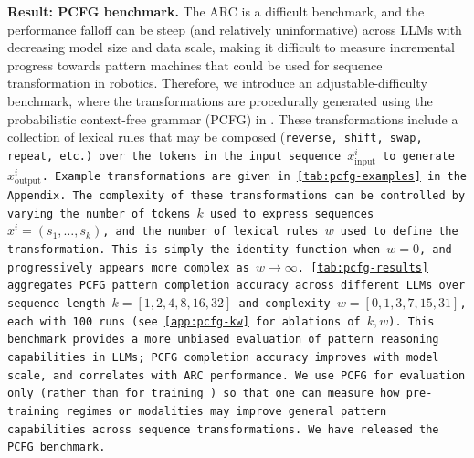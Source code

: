 \textbf{Result: PCFG benchmark.} The ARC is a difficult benchmark, and the performance falloff can be steep (and relatively uninformative) across LLMs with decreasing model size and data scale, making it difficult to measure incremental progress towards pattern machines that could be used for sequence transformation in robotics. Therefore, we introduce an adjustable-difficulty benchmark, where the transformations are procedurally generated using the probabilistic context-free grammar (PCFG) in \citet{hupkes2020compositionality}. 
These transformations include a collection of lexical rules that may be composed (\eg \tt{reverse}, \tt{shift}, \tt{swap}, \tt{repeat}, etc.) over the tokens in the input sequence $x^{i}_{\text{input}}$ to generate $x^{i}_{\text{output}}$.
Example transformations are given in \cref{tab:pcfg-examples} in the Appendix.
The complexity of these transformations can be controlled by varying the number of tokens $k$ used to express sequences $x^i=(s_1,\dots,s_k)$, and the number of lexical rules $w$ used to define the transformation. This is simply the identity function when $w=0$, and progressively appears more complex as $w\rightarrow\infty$. \cref{tab:pcfg-results} aggregates PCFG pattern completion accuracy across different LLMs over sequence length $k = [1, 2, 4, 8, 16, 32]$ and complexity $w = [0, 1, 3, 7, 15, 31]$, each with 100 runs (see \cref{app:pcfg-kw} for ablations of $k, w$).
This benchmark provides a more unbiased evaluation of pattern reasoning capabilities in LLMs; PCFG completion accuracy improves with model scale, and correlates with ARC performance. We use PCFG for evaluation only (rather than for training \cite{hupkes2020compositionality,allen2023physics}) so that one can measure how pre-training regimes or modalities may improve general pattern capabilities across sequence transformations. We have released the PCFG benchmark. 